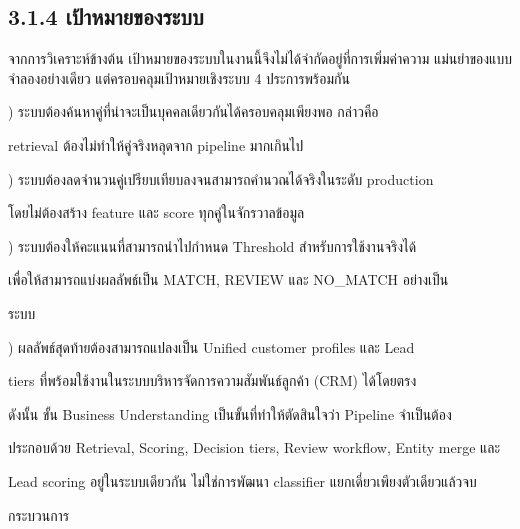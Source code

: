 \documentclass[12pt,a4paper]{report}
\begin{document}
\subsection*{3.1.4 เป้าหมายของระบบ}
จากการวิเคราะห์ข้างต้น เป้าหมายของระบบในงานนี้จึงไม่ได้จำกัดอยู่ที่การเพิ่มค่าความ แม่นยำของแบบจำลองอย่างเดียว แต่ครอบคลุมเป้าหมายเชิงระบบ 4 ประการพร้อมกัน\par
{}) ระบบต้องค้นหาคู่ที่น่าจะเป็นบุคคลเดียวกันได้ครอบคลุมเพียงพอ กล่าวคือ\par
retrieval ต้องไม่ทำให้คู่จริงหลุดจาก pipeline มากเกินไป\par
\clearpage
{}) ระบบต้องลดจำนวนคู่เปรียบเทียบลงจนสามารถคำนวณได้จริงในระดับ production\par
โดยไม่ต้องสร้าง feature และ score ทุกคู่ในจักรวาลข้อมูล\par
{}) ระบบต้องให้คะแนนที่สามารถนำไปกำหนด Threshold สำหรับการใช้งานจริงได้\par
เพื่อให้สามารถแบ่งผลลัพธ์เป็น MATCH, REVIEW และ NO\_MATCH อย่างเป็น\par
ระบบ\par
{}) ผลลัพธ์สุดท้ายต้องสามารถแปลงเป็น Unified customer profiles และ Lead\par
tiers ที่พร้อมใช้งานในระบบบริหารจัดการความสัมพันธ์ลูกค้า (CRM) ได้โดยตรง\par
ดังนั้น ขั้น Business Understanding เป็นขั้นที่ทำให้ตัดสินใจว่า Pipeline จำเป็นต้อง\par
ประกอบด้วย Retrieval, Scoring, Decision tiers, Review workflow, Entity merge และ\par
Lead scoring อยู่ในระบบเดียวกัน ไม่ใช่การพัฒนา classifier แยกเดี่ยวเพียงตัวเดียวแล้วจบ\par
กระบวนการ\par
\end{document}
